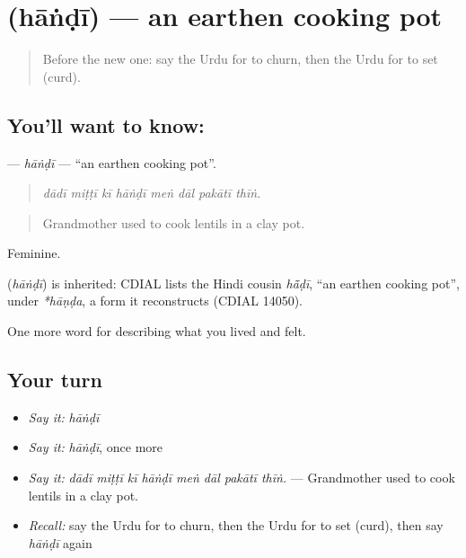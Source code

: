\section[\texorpdfstring{\ur{ہانڈی} (hāṅḍī)}{ہانڈی (hāṅḍī)}]{ (hāṅḍī) — an earthen cooking pot}

\label{lesson:UR-C509-handi}



\begin{quote}
Before the new one: say the Urdu for to churn, then the Urdu for to set (curd).
\end{quote}

\subsection*{You'll want to know: }
\textbf{} — \emph{hāṅḍī} — \textquotedblleft{}an earthen cooking pot\textquotedblright{}.

\begin{quote}
       
\end{quote}

\begin{quote}
\emph{dādī miṭṭī kī hāṅḍī meṅ dāl pakātī thīṅ.}
\end{quote}

\begin{quote}
Grandmother used to cook lentils in a clay pot.
\end{quote}

Feminine.

\begin{cousinweb}
\textbf{} (\emph{hāṅḍī}) is inherited: CDIAL lists the Hindi cousin \emph{hā̃ḍī}, \textquotedblleft{}an earthen cooking pot\textquotedblright{}, under \emph{*hāṇḍa}, a form it reconstructs (CDIAL 14050).
\end{cousinweb}

\begin{grammarlens}[title={What you've built}]
One more word for describing what you lived and felt.
\end{grammarlens}

\subsection*{Your turn}
\begin{itemize}
\raggedright
  \item \emph{Say it:} \emph{hāṅḍī}
  \item \emph{Say it:} \emph{hāṅḍī}, once more
  \item \emph{Say it:} \emph{dādī miṭṭī kī hāṅḍī meṅ dāl pakātī thīṅ.} — Grandmother used to cook lentils in a clay pot.
  \item \emph{Recall:} say the Urdu for to churn, then the Urdu for to set (curd), then say \emph{hāṅḍī} again
\end{itemize}

